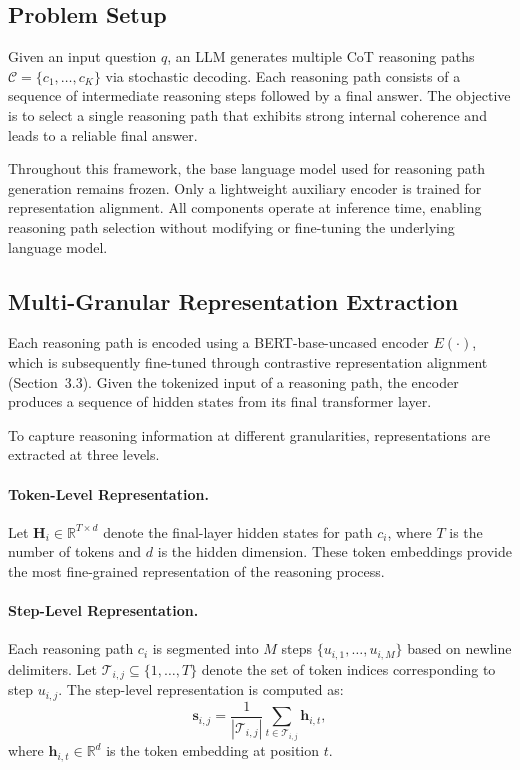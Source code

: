 \documentclass[a4paper,fleqn]{cas-dc}
\begin{document}
\subsection{Problem Setup}
Given an input question $q$, an LLM generates multiple CoT reasoning paths $\mathcal{C} = \{c_1, \ldots, c_K\}$ via stochastic decoding.
Each reasoning path consists of a sequence of intermediate reasoning steps followed by a final answer.
The objective is to select a single reasoning path that exhibits strong internal coherence and leads to a reliable final answer.

Throughout this framework, the base language model used for reasoning path generation remains frozen.
Only a lightweight auxiliary encoder is trained for representation alignment.
All components operate at inference time, enabling reasoning path selection without modifying or fine-tuning the underlying language model.

\subsection{Multi-Granular Representation Extraction}

Each reasoning path is encoded using a BERT-base-uncased encoder $E(\cdot)$, which is subsequently fine-tuned through contrastive representation alignment (Section~3.3).
Given the tokenized input of a reasoning path, the encoder produces a sequence of hidden states from its final transformer layer.

To capture reasoning information at different granularities, representations are extracted at three levels.

\paragraph{Token-Level Representation.}
Let $\mathbf{H}_i \in \mathbb{R}^{T \times d}$ denote the final-layer hidden states for path $c_i$, where $T$ is the number of tokens and $d$ is the hidden dimension.
These token embeddings provide the most fine-grained representation of the reasoning process.

\paragraph{Step-Level Representation.}
Each reasoning path $c_i$ is segmented into $M$ steps $\{u_{i,1}, \dots, u_{i,M}\}$ based on newline delimiters.
Let $\mathcal{T}_{i,j} \subseteq \{1, \dots, T\}$ denote the set of token indices corresponding to step $u_{i,j}$.
The step-level representation is computed as:
\[
\mathbf{s}_{i,j} = \frac{1}{|\mathcal{T}_{i,j}|} \sum_{t \in \mathcal{T}_{i,j}} \mathbf{h}_{i,t},
\]
where $\mathbf{h}_{i,t} \in \mathbb{R}^d$ is the token embedding at position $t$.
\end{document}
